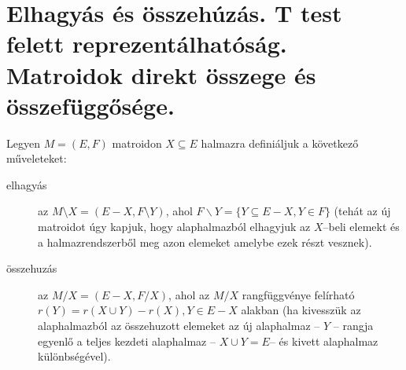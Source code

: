 \skiptooddpage \section[Elhagyás, összehúzás,
összeg,reprezentálhatóság]{Elhagyás és összehúzás. T test felett reprezentálhatóság.
Matroidok direkt összege és összefüggősége.}


Legyen $M=(E,F)$ matroidon $X \subseteq E$ halmazra definiáljuk a következő
műveleteket:
\begin{description}
  \item[elhagyás] az $M \setminus X=(E-X, F \setminus Y)$, ahol $F \backslash
  Y=\{Y\subseteq E-X, Y \in F\}$ (tehát az új matroidot úgy kapjuk, hogy
  alaphalmazból elhagyjuk az $X$--beli elemekt és a halmazrendszerből meg azon
  elemeket amelybe ezek részt vesznek).
  \item[összehuzás]  az $M / X=(E-X, F / X)$, ahol az $M/X$ rangfüggvénye felírható
  $r(Y)=r(X \cup Y) - r(X), Y \in  E-X$ alakban (ha kivesszük az alaphalmazból az
  összehuzott elemeket az új alaphalmaz -- $Y$ -- rangja egyenlő a teljes kezdeti alaphalmaz 
  -- $X \cup Y = E$-- és kivett alaphalmaz különbségével).
\end{description}

